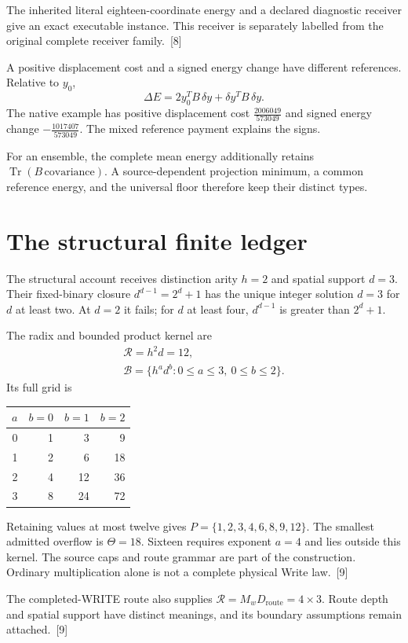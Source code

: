 \documentclass[10pt,twocolumn,letterpaper]{article}
\begin{document}
The inherited literal eighteen-coordinate energy and a declared diagnostic receiver give an exact executable instance. This receiver is separately labelled from the original complete receiver family.~[8]

A positive displacement cost and a signed energy change have different references. Relative to $y_0$,
\[
\Delta E=2y_0^TB\,\delta y+\delta y^TB\,\delta y.
\]
The native example has positive displacement cost $\frac{2006049}{573049}$ and signed energy change $-\frac{1017407}{573049}$. The mixed reference payment explains the signs.

For an ensemble, the complete mean energy additionally retains $\operatorname{Tr}(B\,\text{covariance})$. A source-dependent projection minimum, a common reference energy, and the universal floor therefore keep their distinct types.

\section{The structural finite ledger}
The structural account receives distinction arity $h=2$ and spatial support $d=3$. Their fixed-binary closure $d^{d-1}=2^d+1$ has the unique integer solution $d=3$ for $d$ at least two. At $d=2$ it fails; for $d$ at least four, $d^{d-1}$ is greater than $2^d+1$.

The radix and bounded product kernel are
\[
\begin{gathered}
\mathcal R=h^2d=12,\\
\mathcal B=\{h^ad^b:0\leq a\leq3,\ 0\leq b\leq2\}.
\end{gathered}
\]
Its full grid is
\begin{center}
\begin{tabular}{rrrr}
\toprule
$a$ & $b=0$ & $b=1$ & $b=2$\\
\midrule
0 & 1 & 3 & 9\\
1 & 2 & 6 & 18\\
2 & 4 & 12 & 36\\
3 & 8 & 24 & 72\\
\bottomrule
\end{tabular}
\end{center}
Retaining values at most twelve gives $P=\{1,2,3,4,6,8,9,12\}$. The smallest admitted overflow is $\Theta=18$. Sixteen requires exponent $a=4$ and lies outside this kernel. The source caps and route grammar are part of the construction. Ordinary multiplication alone is not a complete physical Write law.~[9]

The completed-WRITE route also supplies $\mathcal R=M_wD_{\mathrm{route}}=4\times3$. Route depth and spatial support have distinct meanings, and its boundary assumptions remain attached.~[9]
\end{document}
